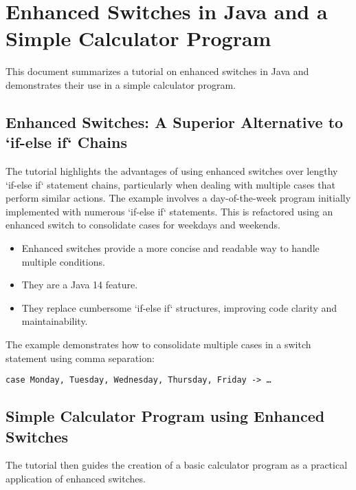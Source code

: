 \documentclass{article}
\begin{document}
\section{Enhanced Switches in Java and a Simple Calculator Program}

This document summarizes a tutorial on enhanced switches in Java and demonstrates their use in a simple calculator program.

\subsection{Enhanced Switches: A Superior Alternative to `if-else if` Chains}

The tutorial highlights the advantages of using enhanced switches over lengthy `if-else if` statement chains, particularly when dealing with multiple cases that perform similar actions.  The example involves a day-of-the-week program initially implemented with numerous `if-else if` statements.  This is refactored using an enhanced switch to consolidate cases for weekdays and weekends.

\begin{itemize}
    \item Enhanced switches provide a more concise and readable way to handle multiple conditions.
    \item They are a Java 14 feature.
    \item They replace cumbersome `if-else if` structures, improving code clarity and maintainability.
\end{itemize}

The example demonstrates how to consolidate multiple cases in a switch statement using comma separation:

\texttt{case Monday, Tuesday, Wednesday, Thursday, Friday -> \dots}


\subsection{Simple Calculator Program using Enhanced Switches}

The tutorial then guides the creation of a basic calculator program as a practical application of enhanced switches.
\end{document}
